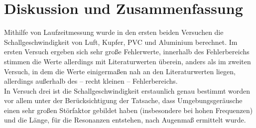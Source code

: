 \section{Diskussion und Zusammenfassung}
Mithilfe von Laufzeitmessung wurde in den ersten beiden Versuchen die Schallgeschwindigkeit von Luft, Kupfer, PVC und Aluminium berechnet. Im ersten Versuch ergeben sich sehr große Fehlerwerte, innerhalb des Fehlerbereichs stimmen die Werte allerdings mit Literaturwerten überein, anders als im zweiten Versuch, in dem die Werte einigermaßen nah an den Literaturwerten liegen, allerdings außerhalb des -- recht kleinen -- Fehlerbereichs.\\
In Versuch drei ist die Schallgeschwindigkeit erstaunlich genau bestimmt worden vor allem unter der Berücksichtigung der Tatsache, dass Umgebungsgeräusche einen sehr großen Störfaktor gebildet haben (insbesondere bei hohen Frequenzen) und die Länge, für die Resonanzen entstehen, nach Augenmaß ermittelt wurde.